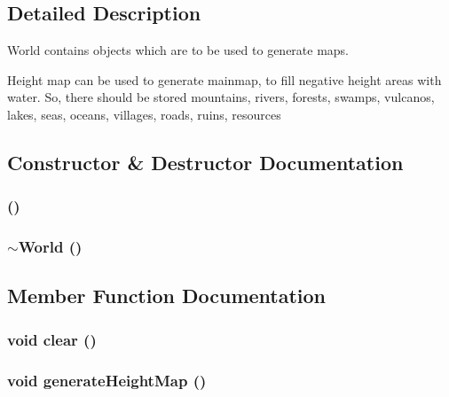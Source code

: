 \subsection{Detailed Description}
World contains objects which are to be used to generate maps. 

Height map can be used to generate mainmap, to fill negative height areas with water. So, there should be stored mountains, rivers, forests, swamps, vulcanos, lakes, seas, oceans, villages, roads, ruins, resources



\subsection{Constructor \& Destructor Documentation}
\subsubsection{ ()}\label{classWorld_a0}


\subsubsection{\setlength{\rightskip}{0pt plus 5cm}$\sim${\bf World} ()\hspace{0.3cm}{\tt  [virtual]}}\label{classWorld_a1}




\subsection{Member Function Documentation}
\subsubsection{\setlength{\rightskip}{0pt plus 5cm}void clear ()\hspace{0.3cm}{\tt  [protected]}}\label{classWorld_b1}


\subsubsection{\setlength{\rightskip}{0pt plus 5cm}void generate\-Height\-Map ()\hspace{0.3cm}{\tt  [protected]}}\label{classWorld_b0}


